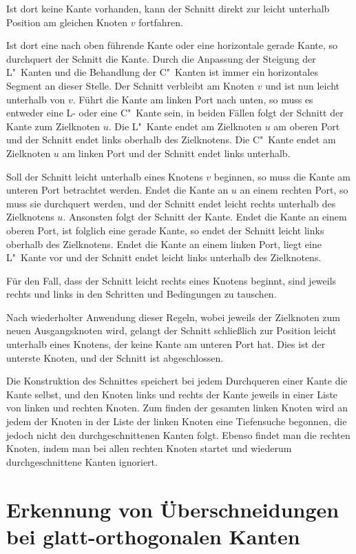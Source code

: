 \documentclass[a4paper]{scrreprt}
\theoremstyle{definition}
\begin{document}
Ist dort keine Kante vorhanden, kann der Schnitt direkt zur leicht unterhalb Position am gleichen Knoten $v$ fortfahren.

Ist dort eine nach oben führende Kante oder eine horizontale gerade Kante, so durchquert der Schnitt die Kante. Durch die Anpassung der Steigung der L"~Kanten und die Behandlung der C"~Kanten ist immer ein horizontales Segment an dieser Stelle. Der Schnitt verbleibt am Knoten $v$ und ist nun leicht unterhalb von $v$. Führt die Kante am linken Port nach unten, so muss es entweder eine L- oder eine C"~Kante sein, in beiden Fällen folgt der Schnitt der Kante zum Zielknoten $u$. Die L"~Kante endet am Zielknoten $u$ am oberen Port und der Schnitt endet links oberhalb des Zielknotens. Die C"~Kante endet am Zielknoten $u$ am linken Port und der Schnitt endet links unterhalb.

Soll der Schnitt leicht unterhalb eines Knotens $v$ beginnen, so muss die Kante am unteren Port betrachtet werden. Endet die Kante an $u$ an einem rechten Port, so muss sie durchquert werden, und der Schnitt endet leicht rechts unterhalb des Zielknotens $u$. Ansonsten folgt der Schnitt der Kante. Endet die Kante an einem oberen Port, ist folglich eine gerade Kante, so endet der Schnitt leicht links oberhalb des Zielknotens. Endet die Kante an einem linken Port, liegt eine L"~Kante vor und der Schnitt endet leicht links unterhalb des Zielknotens.

Für den Fall, dass der Schnitt leicht rechts eines Knotens beginnt, sind jeweils rechts und links in den Schritten und Bedingungen zu tauschen.

Nach wiederholter Anwendung dieser Regeln, wobei jeweils der Zielknoten zum neuen Ausgangsknoten wird, gelangt der Schnitt schließlich zur Position leicht unterhalb eines Knotens, der keine Kante am unteren Port hat. Dies ist der unterste Knoten, und der Schnitt ist abgeschlossen.

Die Konstruktion des Schnittes speichert bei jedem Durchqueren einer Kante die Kante selbst, und den Knoten links und rechts der Kante jeweils in einer Liste von linken und rechten Knoten. Zum finden der gesamten linken Knoten wird an jedem der Knoten in der Liste der linken Knoten eine Tiefensuche begonnen, die jedoch nicht den durchgeschnittenen Kanten folgt. Ebenso findet man die rechten Knoten, indem man bei allen rechten Knoten startet und wiederum durchgeschnittene Kanten ignoriert.

\section{Erkennung von Überschneidungen bei glatt-orthogonalen Kanten}
\end{document}

